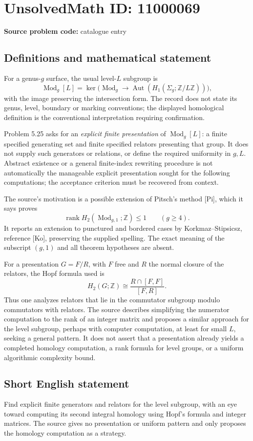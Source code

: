 \documentclass[11pt]{article}
\newcommand{\Z}{\mathbb{Z}}
\begin{document}
\section*{UnsolvedMath ID: 11000069}
\textbf{Source problem code:} catalogue entry
\subsection{Definitions and mathematical statement}
For a genus-\(g\) surface, the usual level-\(L\) subgroup is
\[
 \operatorname{Mod}_g[L]=
 \ker\bigl(\operatorname{Mod}_g\to
             \operatorname{Aut}(H_1(\Sigma_g;\Z/L\Z))\bigr),
\]
with the image preserving the intersection form. The record does not state its genus, level, boundary or marking conventions; the displayed homological definition is the conventional interpretation requiring confirmation.

Problem 5.25 asks for an \emph{explicit finite presentation} of \(\operatorname{Mod}_g[L]\): a finite specified generating set and finite specified relators presenting that group. It does not supply such generators or relations, or define the required uniformity in \(g,L\). Abstract existence or a general finite-index rewriting procedure is not automatically the manageable explicit presentation sought for the following computations; the acceptance criterion must be recovered from context.

The source's motivation is a possible extension of Pitsch's method [Pi], which it says proves
\[
 \operatorname{rank}H_2(\operatorname{Mod}_{g,1};\Z)\le1
 \qquad(g\ge4).
\]
It reports an extension to punctured and bordered cases by Korkmaz--Stipsicsz, reference [Ko], preserving the supplied spelling. The exact meaning of the subscript \((g,1)\) and all theorem hypotheses are absent.

For a presentation \(G=F/R\), with \(F\) free and \(R\) the normal closure of the relators, the Hopf formula used is
\[
 H_2(G;\Z)\cong\frac{R\cap[F,F]}{[F,R]}.\tag{17}
\]
Thus one analyzes relators that lie in the commutator subgroup modulo commutators with relators. The source describes simplifying the numerator computation to the rank of an integer matrix and proposes a similar approach for the level subgroup, perhaps with computer computation, at least for small \(L\), seeking a general pattern. It does not assert that a presentation already yields a completed homology computation, a rank formula for level groups, or a uniform algorithmic complexity bound.
\subsection{Short English statement}
Find explicit finite generators and relators for the level subgroup, with an eye toward computing its second integral homology using Hopf's formula and integer matrices. The source gives no presentation or uniform pattern and only proposes the homology computation as a strategy.
\end{document}
